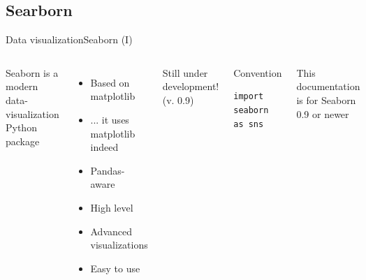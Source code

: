 \documentclass[10pt,compress]{beamer} %
\begin{document}
\subsection{Searborn}

\begin{frame}[fragile]{Data visualization}{Seaborn (I)}
	\begin{columns}
	Seaborn is a modern data-visualization Python package
	\begin{itemize}
		\item Based on matplotlib
		\item ... it uses matplotlib indeed
		\item Pandas-aware
		\item High level
		\item Advanced visualizations
		\item Easy to use
	\end{itemize}
	Still under development! (v. 0.9)
	\begin{block}{\footnotesize{Convention}}
	\vspace{-0.2cm} 
	\begin{lstlisting}
import seaborn as sns
\end{lstlisting}
	\vspace{-0.2cm} 
	\end{block}

	\begin{alertblock}{}
	\vspace{-0.2cm} 
	\footnotesize{This documentation is for Seaborn 0.9 or newer}
	\vspace{-0.2cm} 
	\end{alertblock}

	\end{columns}
\end{frame}
\end{document}
